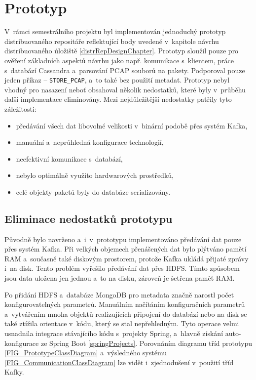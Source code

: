 \section{Prototyp} \label{prototypeSection}
V~rámci semestrálního projektu byl implementován jednoduchý prototyp distribuovaného repositáře reflektující body uvedené v~kapitole návrhu distribuovaného úložiště \ref{distrRepDesignChapter}. Prototyp sloužil pouze pro ověření základních aspektů návrhu jako např. komunikace s~klientem, práce s~databází Cassandra a~parsování PCAP souborů na pakety. Podporoval pouze jeden příkaz -- \texttt{STORE\_PCAP}, a~to také bez použití metadat. Prototyp nebyl vhodný pro nasazení neboť obsahoval několik nedostatků, které byly v~průběhu další implementace eliminovány. Mezi nejdůležitější nedostatky patřily tyto záležitosti:

\begin{itemize}
    \item předávání všech dat libovolné velikosti v~binární podobě přes systém Kafka,
    
    \item manuální a~neprůhledná konfigurace technologií,
    
    \item neefektivní komunikace s~databází,
    
    \item nebylo optimálně využito hardwarových prostředků,
    
    \item celé objekty paketů byly do databáze serializovány.
\end{itemize}

\subsection{Eliminace nedostatků prototypu} \label{improvementsInImpl}
Původně bylo navrženo a~i~v~prototypu implementováno předávání dat pouze přes systém Kafka. Při velkých objemech přenášených dat bylo plýtváno pamětí RAM a~současně také diskovým prostorem, protože Kafka ukládá přijaté zprávy i~na disk. Tento problém vyřešilo předávání dat přes HDFS. Tímto způsobem jsou data uložena jen jednou a~to na disku, zároveň je šetřena paměť RAM.

Po přidání HDFS a~databáze MongoDB pro metadata značně narostl počet konfigurovatelných parametrů. Manuálním načítáním konfiguračních parametrů a~vytvářením mnoha objektů realizujících připojení do databází nebo na disk se také ztížila orientace v~kódu, který se stal nepřehledným. Tyto operace velmi usnadnila integrace stávajícího kódu s~projekty Spring, a~hlavně získání auto-konfigurace ze Spring Boot \ref{springProjects}. Porovnáním diagramu tříd prototypu \ref{FIG_PrototypeClassDiagram} a~výsledného systému \ref{FIG_CommunicationClassDiagram} lze vidět i~zjednodušení v~použití tříd Kafky.

